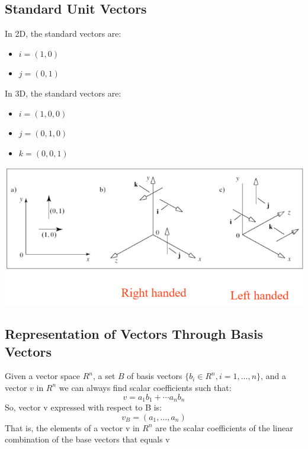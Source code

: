 \documentclass{article}
\begin{document}
\subsection*{Standard Unit Vectors}
In 2D, the standard vectors are:
\begin{itemize}
    \item $i = (1, 0)$
    \item $j = (0, 1)$
\end{itemize}
In 3D, the standard vectors are:
\begin{itemize}
    \item $i = (1, 0, 0)$
    \item $j = (0, 1, 0)$
    \item $k = (0, 0, 1)$
\end{itemize}
\begin{center}
    \includegraphics*[scale=0.8]{W2_1.png}
\end{center}

\subsection*{Representation of Vectors Through Basis Vectors}
Given a vector space $R^n$, a set $B$ of basis vectors $\{b_i \in R^n, i = 1, \dots, n\}$, and a vector $v$ in $R^n$ we can always find scalar coefficients such that:
\[v = a_1 b_1 + \cdots a_n b_n\]
So, vector v expressed with respect to B is:
\[v_B = (a_1, \dots, a_n)\]
That is, the elements of a vector v in $R^n$ are the scalar coefficients of the linear combination of the base vectors that equals v
\end{document}

